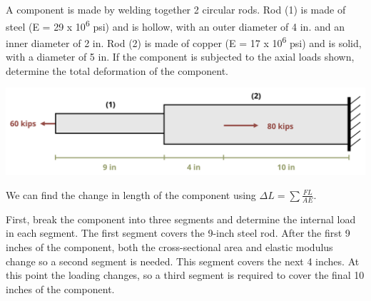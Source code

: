 \documentclass[
  letterpaper,
  DIV=11,
  numbers=noendperiod]{scrreprt}
\begin{document}
\begin{tcolorbox}[enhanced jigsaw, colbacktitle=quarto-callout-note-color!10!white, title={Example 5.3: Axial change in length problem with different loads, areas,
and materials}, coltitle=black, leftrule=.75mm, rightrule=.15mm, opacityback=0, breakable, colframe=quarto-callout-note-color-frame, left=2mm, arc=.35mm, colback=white, bottomrule=.15mm, bottomtitle=1mm, toptitle=1mm, titlerule=0mm, opacitybacktitle=0.6, toprule=.15mm]

A component is made by welding together 2 circular rods. Rod (1) is made
of steel (E = 29 x 10\textsuperscript{6} psi) and is hollow, with an
outer diameter of 4 in. and an inner diameter of 2 in. Rod (2) is made
of copper (E = 17 x 10\textsuperscript{6} psi) and is solid, with a
diameter of 5 in. If the component is subjected to the axial loads
shown, determine the total deformation of the component.

\begin{center}
\includegraphics{images/PNGs/Example 5.3 part 1.png}
\end{center}

\begin{tcolorbox}[enhanced jigsaw, colbacktitle=quarto-callout-note-color!10!white, title={Solution}, coltitle=black, leftrule=.75mm, rightrule=.15mm, opacityback=0, breakable, colframe=quarto-callout-note-color-frame, left=2mm, arc=.35mm, colback=white, bottomrule=.15mm, bottomtitle=1mm, toptitle=1mm, titlerule=0mm, opacitybacktitle=0.6, toprule=.15mm]

We can find the change in length of the component using
\(\Delta L=\sum \frac{F L}{A E}\).

First, break the component into three segments and determine the
internal load in each segment. The first segment covers the 9-inch steel
rod. After the first 9 inches of the component, both the cross-sectional
area and elastic modulus change so a second segment is needed. This
segment covers the next 4 inches. At this point the loading changes, so
a third segment is required to cover the final 10 inches of the
component.


\end{tcolorbox}
\end{tcolorbox}
\end{document}
